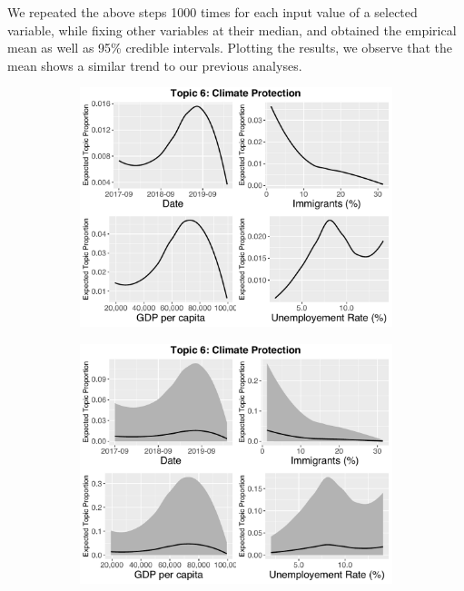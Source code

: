 We repeated the above steps 1000 times for each input value of a selected variable, while fixing other variables at their median, and obtained the empirical mean as well as 95\% credible intervals. Plotting the results, we observe that the mean shows a similar trend to our previous analyses. 
\begin{figure}[h!]
    \centering
     \captionsetup{justification=centering,margin=2cm}
  \begin{subfigure}[b]{0.3\linewidth}
    \includegraphics[width=\linewidth]{../plots/5_1/direct_t6_without_credible.pdf}
  \end{subfigure}
  \begin{subfigure}[b]{0.3\linewidth}
    \includegraphics[width=\linewidth]{../plots/5_1/direct_t6_with_credible.pdf}

\end{subfigure}
\end{figure}
